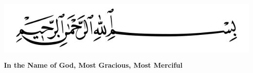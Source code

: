 \thispagestyle{empty}
\section*{}
\vspace{40ex}

\begin{center}
    \includegraphics[width=150mm]{utils/figures/basmalah.png}

    \textbf{In the Name of God, Most Gracious, Most Merciful}

\end{center}